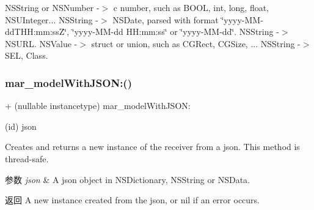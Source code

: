 {\ttfamily N\+S\+String} or {\ttfamily N\+S\+Number} -\/$>$ c number, such as B\+O\+OL, int, long, float, N\+S\+U\+Integer... {\ttfamily N\+S\+String} -\/$>$ N\+S\+Date, parsed with format \char`\"{}yyyy-\/\+M\+M-\/dd\textquotesingle{}\+T\textquotesingle{}\+H\+H\+:mm\+:ss\+Z\char`\"{}, \char`\"{}yyyy-\/\+M\+M-\/dd H\+H\+:mm\+:ss\char`\"{} or \char`\"{}yyyy-\/\+M\+M-\/dd\char`\"{}. {\ttfamily N\+S\+String} -\/$>$ N\+S\+U\+RL. {\ttfamily N\+S\+Value} -\/$>$ struct or union, such as C\+G\+Rect, C\+G\+Size, ... {\ttfamily N\+S\+String} -\/$>$ S\+EL, Class. \mbox{\label{category_n_s_object_07_m_a_r_model_08_a36ca2762b4bfa7401de70f8a87564406}} 
\subsubsection{\texorpdfstring{mar\+\_\+model\+With\+J\+S\+O\+N\+:()}{mar\_modelWithJSON:()}}
{\footnotesize\ttfamily + (nullable instancetype) mar\+\_\+model\+With\+J\+S\+O\+N\+: \begin{DoxyParamCaption}\item[{(id)}]{json }\end{DoxyParamCaption}}

Creates and returns a new instance of the receiver from a json. This method is thread-\/safe.


\begin{DoxyParams}{参数}
{\em json} & A json object in {\ttfamily N\+S\+Dictionary}, {\ttfamily N\+S\+String} or {\ttfamily N\+S\+Data}.\\
\hline
\end{DoxyParams}
\begin{DoxyReturn}{返回}
A new instance created from the json, or nil if an error occurs. 
\end{DoxyReturn}
\mbox{\label{category_n_s_object_07_m_a_r_model_08_a397b73668196517dd8d59b7f50b9affd}} 
